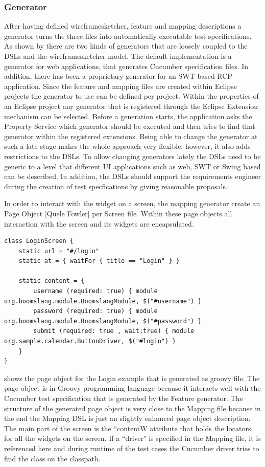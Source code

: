 \documentclass{sig-alternate-05-2015}
\begin{document}
{\subsubsection{Generator}\label{sec:Generator} 
After having defined wireframesketcher, feature and mapping descriptions a generator turns the three files into automatically executable test specifications.
As shown by  there are two kinds of generators that are loosely coupled to the DSLs and the wireframesketcher model.
The default implementation is a generator for web applications, that generates Cucumber specification files.
In addition, there has been a proprietary generator for an SWT based RCP application.
Since the feature and mapping files are created within Eclipse projects the generator to use can be defined per project.
Within the properties of an Eclipse project any generator that is registered through the Eclipse Extension mechanism can be selected.
Before a generation starts, the application asks the Property Service which generator should be executed and then tries to find that generator within the registered extensions.
Being able to change the generator at such a late stage makes the whole approach very flexible, however, it also adds restrictions to the DSLs.
To allow changing generators lately the DSLs need to be generic to a level that different UI applications such as web, SWT or Swing based can be described.
In addition, the DSLs should support the requirements engineer during the creation of test specfications by giving reasonable proposals.

In order to interact with the widget on a screen, the mapping generator create an Page Object [Quele Fowler] per Screen file.
Within these page objects all interaction with the screen and its widgets are encapsulated.

\begin{lstlisting}[captionpos=b, caption=Generated Page Object, label={lst:MappingGenerated}, language=dsl]
class LoginScreen {
	static url = "#/login"
	static at = { waitFor { title == "Login" } }
	
	static content = {
		username (required: true) { module org.boomslang.module.BoomslangModule, $("#username") }
		password (required: true) { module org.boomslang.module.BoomslangModule, $("#password") }
		submit (required: true , wait:true) { module org.sample.calendar.ButtonDriver, $("#login") }
	}
}
\end{lstlisting}

 shows the page object for the Login example that is generated as groovy file.
The page object is in Groovy programming language because it interacts well with the Cucumber test specification that is generated by the Feature generator.
The structure of the generated page object is very close to the Mapping file because in the end the Mapping DSL is just an slightly enhanced page object description.
The main part of the screen is the ``contentW attribute that holds the locators for all the widgets on the screen.
If a ``driver" is specified in the Mapping file, it is referenced here and during runtime of the test cases the Cucumber driver tries to find the class on the classpath.

}
\end{document}
